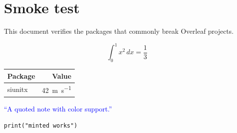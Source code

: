 \documentclass{article}
\begin{document}
\section{Smoke test}

This document verifies the packages that commonly break Overleaf projects.

\[
  \int_0^1 x^2\,dx = \frac{1}{3}
\]

\begin{tabular}{lr}
\toprule
Package & Value \\
\midrule
siunitx & \SI{42}{\meter\per\second} \\
\bottomrule
\end{tabular}

\textcolor{blue}{\enquote{A quoted note with color support.}}

\begin{verbatim}
print("minted works")
\end{verbatim}

\end{document}
